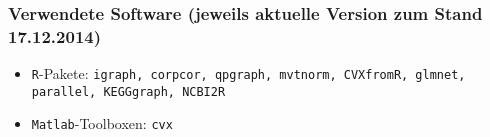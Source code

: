 \documentclass{beamer}
\begin{document}
\begin{frame}
	\frametitle{Verwendete Software (jeweils aktuelle Version zum Stand 17.12.2014)}
	\begin{itemize}
	\item \texttt{R}-Pakete: \texttt{igraph, corpcor, qpgraph, mvtnorm, CVXfromR, glmnet, parallel, KEGGgraph, NCBI2R}
	\item \texttt{Matlab}-Toolboxen: \texttt{cvx}
	\end{itemize}
\end{frame}


%
%


%
\end{document}

